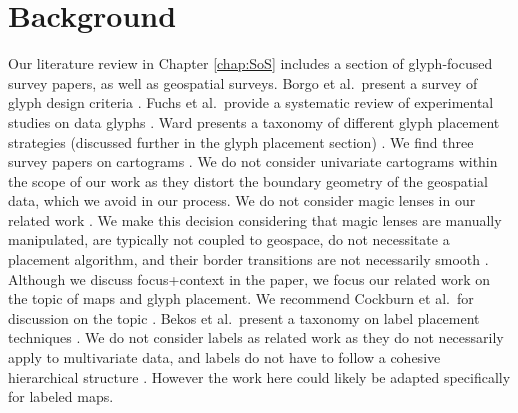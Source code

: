 \section{Background}
Our literature review in Chapter \ref{chap:SoS} includes a section of glyph-focused survey papers, as well as geospatial surveys.  Borgo et al.\ present a survey of glyph design criteria \cite{borgo2013glyph}. Fuchs et al.\ provide a systematic review of experimental studies on data glyphs \cite{fuchs2016systematic}.
Ward presents a taxonomy of different glyph placement strategies (discussed further in the glyph placement section) \cite{ward2002taxonomy}. We find three survey papers on cartograms \cite{tobler2004thirty, nusrat2015task, nusrat2016state}. We do not consider univariate cartograms within the scope of our work as they distort the boundary geometry of the geospatial data, which we avoid in our process. We do not consider magic lenses in our related work \cite{tominski2014survey}. We make this decision considering that magic lenses are manually manipulated, are typically not coupled to geospace, do not necessitate a placement algorithm, and their border transitions are not necessarily smooth \cite{tominski2016interactive}. Although we discuss focus+context in the paper, we focus our related work on the topic of maps and glyph placement. We recommend Cockburn et al.\ for discussion on the topic \cite{cockburn2008review}. 
Bekos et al.\ present a taxonomy on label placement techniques \cite{bekos2019external}. We do not consider labels as related work as they do not necessarily apply to multivariate data, and labels do not have to follow a cohesive hierarchical structure \cite{luboschik2008particle}. However the work here could likely be adapted specifically for labeled maps. 

